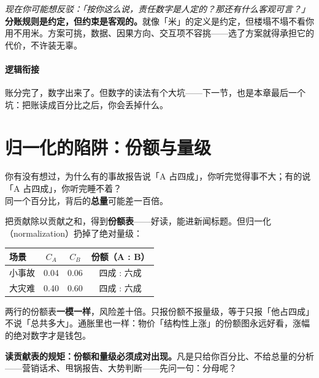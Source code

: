 \documentclass[../../main2.tex]{subfiles}
\begin{document}

\begin{questionbox}
	\textit{现在你可能想反驳：「按你这么说，责任数字是人定的？那还有什么客观可言？」}\\
	\textbf{分账规则是约定，但约束是客观的。}就像「米」的定义是约定，但楼塌不塌不看你用不用米。方案可挑，数据、因果方向、交互项不容挑——选了方案就得承担它的代价，不许装无辜。
\end{questionbox}

\paragraph*{逻辑衔接}
	账分完了，数字出来了。但数字的读法有个大坑——下一节，也是本章最后一个坑：把账读成百分比之后，你会丢掉什么。

\section{归一化的陷阱：份额与量级}

\begin{readingnote}
	你有没有想过，为什么有的事故报告说「A 占四成」，你听完觉得事不大；有的说「A 占四成」，你听完睡不着？\\
	同一个百分比，背后的\textbf{总量}可能差一百倍。
\end{readingnote}

把贡献除以贡献之和，得到\textbf{份额表}——好读，能进新闻标题。但归一化（normalization）扔掉了绝对量级：

\begin{center}
\begin{tabular}{lccc}
\toprule
场景 & $C_A$ & $C_B$ & 份额（A : B） \\
\midrule
小事故 & 0.04 & 0.06 & 四成 : 六成 \\
大灾难 & 0.40 & 0.60 & 四成 : 六成 \\
\bottomrule
\end{tabular}
\end{center}

两行的份额表\textbf{一模一样}，风险差十倍。只报份额不报量级，等于只报「他占四成」不说「总共多大」。通胀里也一样：物价「结构性上涨」的份额图永远好看，涨幅的绝对数字才是钱包。

\begin{warningbox}
	\textbf{读贡献表的规矩：份额和量级必须成对出现。}凡是只给你百分比、不给总量的分析——营销话术、甩锅报告、大势判断——先问一句：分母呢？
\end{warningbox}
\end{document}
